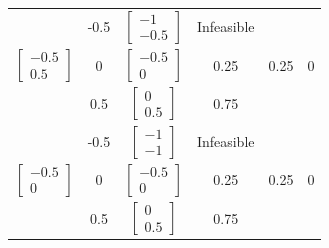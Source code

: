 \documentclass[14pt, a4paper]{extarticle}
\begin{document}
\begin{latin}
\begin{longtable}{|c|c|c|c|c|c|}
			&          -0.5              &$\begin{bmatrix} -1 \\ -0.5 \end{bmatrix}$      & Infeasible                        &       &          \\  \cline{2-4} 
		\multirow{-3}{*}{$\begin{bmatrix} -0.5 \\ 0.5 \end{bmatrix}$}&     0                   &$\begin{bmatrix} -0.5 \\ 0 \end{bmatrix}$      &     0.25                   &  0.25           &   0    \\  \cline{2-4} 
			&         0.5               &$\begin{bmatrix} 0 \\ 0.5 \end{bmatrix}$      &        0.75                    &          &      \\  \cline{2-4} \hline
		
			&              -0.5          &$\begin{bmatrix} -1 \\ -1 \end{bmatrix}$      & Infeasible                        &      &     \\  \cline{2-4} 
		\multirow{-3}{*}{$\begin{bmatrix} -0.5 \\ 0 \end{bmatrix}$}&      0                  &$\begin{bmatrix} -0.5 \\ 0 \end{bmatrix}$      &      0.25                  &  0.25          &     0   \\  \cline{2-4} 
			&              0.5          &$\begin{bmatrix} 0 \\ 0.5 \end{bmatrix}$      &    0.75                &                 &     \\  \cline{2-4} \hline	
		

\end{longtable}
\end{latin}
\end{document}
